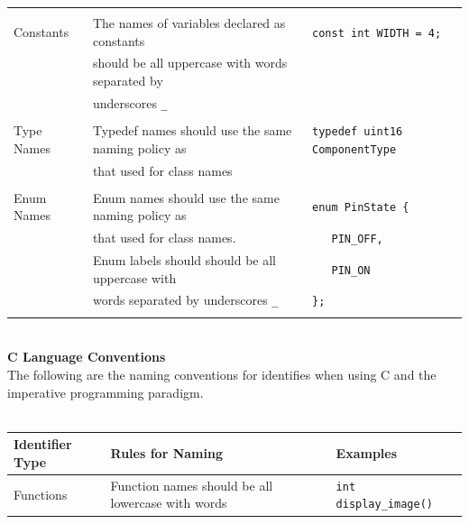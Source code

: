\documentclass{CSSRforAfrica}
\newcommand{\blank}{~\\}
\begin{document}
\begin{appendices}
{\begin{tabular}{l|l l}
                &                                                    &                                         \\ 
Constants       & The names of variables declared as constants       &{\small \verb+const int WIDTH = 4;+}     \\ 
                & should be all uppercase with words separated by    &                                         \\ 
                & underscores {\small \verb+_+}                      &                                         \\ 
                &                                                    &                                         \\ 
Type Names      & Typedef names should use the same naming policy as &{\small \verb+typedef uint16 ComponentType+}\\ 
                & that used for class names                          &                                         \\ 
                &                                                    &                                         \\
Enum Names      & Enum names should use the same naming policy as    &{\small \verb+enum PinState {+}          \\ 
                & that used for class names.                         &{\small \verb+   PIN_OFF,+}              \\ 
                & Enum labels should should be all uppercase with    &{\small \verb+   PIN_ON  +}              \\ 
                & words separated by underscores \verb+_+            &{\small \verb+};+}                       \\ 
                &                                                    &                                          \\ 
\end{tabular}
}
\blank
{\bf C Language Conventions}\\
The following are the naming conventions for identifies when using C and the 
imperative programming paradigm.
\blank
~
\blank
{\small
\begin{tabular}{l|l l}
Identifier Type & Rules for Naming                                   &Examples                                 \\ \hline
Functions       & Function names should be all lowercase with words  &{\small \verb+int  display_image()+}     \\ 

\end{tabular}}
\end{appendices}
\end{document}
